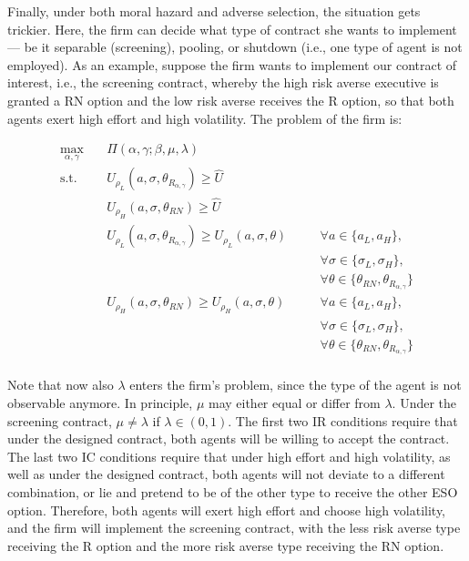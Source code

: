 Finally, under both moral hazard and adverse selection, the situation gets trickier. Here, the firm can decide what type of contract she wants to implement --- be it separable (screening), pooling, or shutdown (i.e., one type of agent is not employed). As an example, suppose the firm wants to implement our contract of interest, i.e., the screening contract, whereby the high risk averse executive is granted a RN option and the low risk averse receives the R option, so that both agents exert high effort and high volatility. The problem of the firm is:

\begin{equation}
    \label{eqn:pbl_bestIII_screening}
    \begin{alignedat}{2}
        \max_{\alpha, \gamma} \quad & \Pi (\alpha, \gamma; \beta, \mu, \lambda) \\
        \textrm{s.t.}       \quad & U_{\rho_L}(a, \sigma, \theta_{R_{\alpha, \gamma}}) \ge \hat{U} \\
                            \quad & U_{\rho_H}(a, \sigma, \theta_{RN}) \ge \hat{U} \\
                            \quad & U_{\rho_L}(a, \sigma, \theta_{R_{\alpha, \gamma}}) \ge U_{\rho_L}(a, \sigma, \theta) &\quad& \forall a \in \{ a_L, a_H \}, \\
                            \quad & &\quad& \forall \sigma \in \{ \sigma_L, \sigma_H \}, \\
                            \quad & &\quad& \forall \theta \in \{ \theta_{RN}, \theta_{R_{\alpha, \gamma}} \} \\ 
                            \quad & U_{\rho_H}(a, \sigma, \theta_{RN}) \ge U_{\rho_H}(a, \sigma, \theta) &\quad& \forall a \in \{ a_L, a_H \}, \\
                            \quad & &\quad& \forall \sigma \in \{ \sigma_L, \sigma_H \}, \\
                            \quad & &\quad& \forall \theta \in \{ \theta_{RN}, \theta_{R_{\alpha, \gamma}} \} \\ 
    \end{alignedat}
    \end{equation}



Note that now also $\lambda$ enters the firm's problem, since the type of the agent is not observable anymore. In principle, $\mu$ may either equal or differ from $\lambda$. Under the screening contract, $\mu \neq \lambda$ if $\lambda \in (0,1)$.
The first two IR conditions require that under the designed contract, both agents will be willing to accept the contract. The last two IC conditions require that under high effort and high volatility, as well as under the designed contract, both agents will not deviate to a different combination, or lie and pretend to be of the other type to receive the other ESO option. Therefore, both agents will exert high effort and choose high volatility, and the firm will implement the screening contract, with the less risk averse type receiving the R option and the more risk averse type receiving the RN option.

